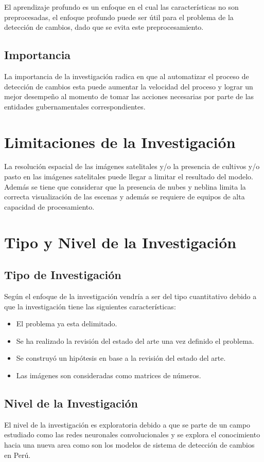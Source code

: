  El aprendizaje profundo es un enfoque en el cual las características no son preprocesadas, el enfoque profundo puede ser útil para el problema de la detección de cambios, dado que se evita este preprocesamiento.
\subsection{Importancia}
La importancia de la investigación radica en que al automatizar el proceso de detección de cambios esta  puede aumentar la velocidad del proceso y lograr un mejor desempeño al momento de tomar las acciones necesarias por parte de las entidades gubernamentales correspondientes.
\section{Limitaciones de la Investigación}
La resolución espacial de las imágenes satelitales y/o la presencia de cultivos y/o pasto en las imágenes satelitales puede llegar a limitar el resultado del modelo. Además se tiene que considerar que la presencia de nubes y neblina limita la correcta visualización de las escenas y además se requiere de equipos de alta capacidad de procesamiento. 
\section{Tipo y Nivel de la Investigación}
\subsection{Tipo de Investigación}
Según \cite{hernandez2010metodologia} el enfoque de la investigación vendría a ser del tipo cuantitativo  debido a que la investigación tiene las siguientes características:
\begin{itemize}
    \item El problema ya esta delimitado.
    \item Se ha realizado la revisión del estado del arte una vez definido el problema.
    \item Se construyó un hipótesis en base a la revisión del estado del arte.
    \item Las imágenes son consideradas como matrices de números.
\end{itemize}{}

\subsection{Nivel de la Investigación}
El nivel de la investigación es exploratoria debido a que se parte de un campo estudiado como las redes neuronales convolucionales y se explora el conocimiento hacia una nueva area como son los modelos de sistema de detección de cambios en Perú.

